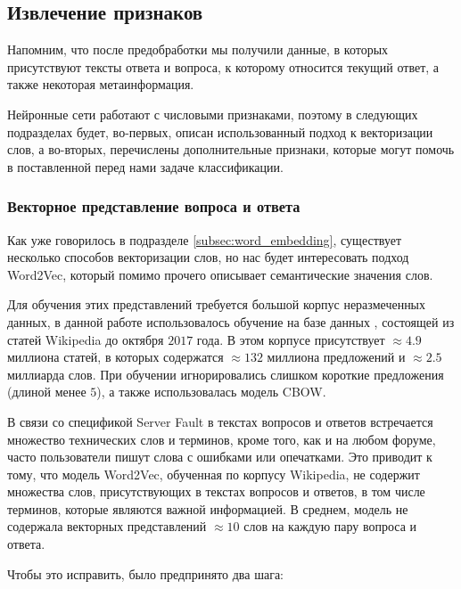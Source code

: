 \documentclass[../diploma.tex]{subfiles}
\begin{document}
	\label{sec:methods_and_implementation}

	\subsection{Извлечение признаков}

	Напомним, что после предобработки мы получили данные, 
	в которых присутствуют тексты ответа и вопроса, к которому относится текущий ответ, а также некоторая метаинформация.

	Нейронные сети работают с числовыми признаками, 
	поэтому в следующих подразделах будет, во-первых, описан использованный подход к векторизации слов, 
	а во-вторых, перечислены дополнительные признаки, которые могут помочь в поставленной перед нами задаче классификации.

	\subsubsection{Векторное представление вопроса и ответа}

   	Как уже говорилось в подразделе \ref{subsec:word_embedding}, существует несколько способов векторизации слов,
   	но нас будет интересовать подход Word2Vec, который помимо прочего описывает семантические значения слов.

   	Для обучения этих представлений требуется большой корпус неразмеченных данных, 
   	в данной работе использовалось обучение на базе данных \cite{online:wiki_dump}, состоящей из статей Wikipedia до октября $2017$ года.
   	В этом корпусе присутствует $\approx 4.9$ миллиона статей, в которых содержатся $\approx 132$ миллиона предложений и $\approx 2.5$ миллиарда слов.
   	При обучении игнорировались слишком короткие предложения (длиной менее $5$), а также использовалась модель CBOW.

   	В связи со спецификой Server Fault в текстах вопросов и ответов встречается множество технических слов и терминов, 
   	кроме того, как и на любом форуме, часто пользователи пишут слова с ошибками или опечатками.
   	Это приводит к тому, что модель Word2Vec, обученная по корпусу Wikipedia, не содержит множества слов, присутствующих в текстах вопросов и ответов, 
   	в том числе терминов, которые являются важной информацией. В среднем, модель не содержала векторных представлений $\approx 10$ слов на каждую пару вопроса и ответа.

   	Чтобы это исправить, было предпринято два шага: 
   	
\end{document}
